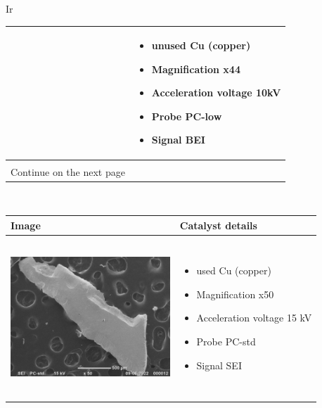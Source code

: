 Ir\documentclass{article}
\begin{document}
\begin{center}
\begin{longtable}
\begin{tabular}{ | m{7cm} | m{7cm} | }
\begin{minipage}{.3\textwidth}
    \end{minipage}
    &
      \begin{itemize}
        \item unused Cu (copper)
        \item Magnification x44
        \item Acceleration voltage 10kV
        \item Probe PC-low
        \item Signal BEI
      \end{itemize} \\ \hline
    \\
    Continue on the next page & \\ \hline
    \end{tabular}
    \end{longtable}
\begin{longtable}   
\label{tab:long} \\
  \centering
  \begin{tabular}{ | m{7cm} | m{7cm} | }
    \hline
    Image & Catalyst details  \\ \hline
    \begin{minipage}{.3\textwidth}
      \includegraphics[width=60mm, height=60mm]{pictures/cu3.jpg}
    \end{minipage}
    &
      \begin{itemize}
        \item used Cu (copper)
        \item Magnification x50
        \item Acceleration voltage 15 kV
        \item Probe PC-std
        \item Signal SEI
      \end{itemize} \\ \hline

\end{tabular}
\end{longtable}
\end{center}
\end{document}
